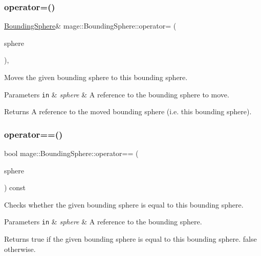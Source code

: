 \subsubsection{\texorpdfstring{operator=()}{operator=()}\hspace{0.1cm}{\footnotesize\ttfamily [2/2]}}
{\footnotesize\ttfamily \mbox{\hyperlink{classmage_1_1_bounding_sphere}{Bounding\+Sphere}}\& mage\+::\+Bounding\+Sphere\+::operator= (\begin{DoxyParamCaption}\item[{\mbox{\hyperlink{classmage_1_1_bounding_sphere}{Bounding\+Sphere}} \&\&}]{sphere }\end{DoxyParamCaption})\hspace{0.3cm}{\ttfamily [default]}, {\ttfamily [noexcept]}}

Moves the given bounding sphere to this bounding sphere.


\begin{DoxyParams}[1]{Parameters}
\mbox{\tt in}  & {\em sphere} & A reference to the bounding sphere to move. \\
\hline
\end{DoxyParams}
\begin{DoxyReturn}{Returns}
A reference to the moved bounding sphere (i.\+e. this bounding sphere). 
\end{DoxyReturn}
\mbox{\label{classmage_1_1_bounding_sphere_adc183c59a09a071fbc78b833cc66f218}} 
\subsubsection{\texorpdfstring{operator==()}{operator==()}}
{\footnotesize\ttfamily bool mage\+::\+Bounding\+Sphere\+::operator== (\begin{DoxyParamCaption}\item[{const \mbox{\hyperlink{classmage_1_1_bounding_sphere}{Bounding\+Sphere}} \&}]{sphere }\end{DoxyParamCaption}) const\hspace{0.3cm}{\ttfamily [noexcept]}}

Checks whether the given bounding sphere is equal to this bounding sphere.


\begin{DoxyParams}[1]{Parameters}
\mbox{\tt in}  & {\em sphere} & A reference to the bounding sphere. \\
\hline
\end{DoxyParams}
\begin{DoxyReturn}{Returns}
{\ttfamily true} if the given bounding sphere is equal to this bounding sphere. {\ttfamily false} otherwise. 
\end{DoxyReturn}
\mbox{\label{classmage_1_1_bounding_sphere_aec1440ef7a88b85ae6a310a41b5b7f20}} 
